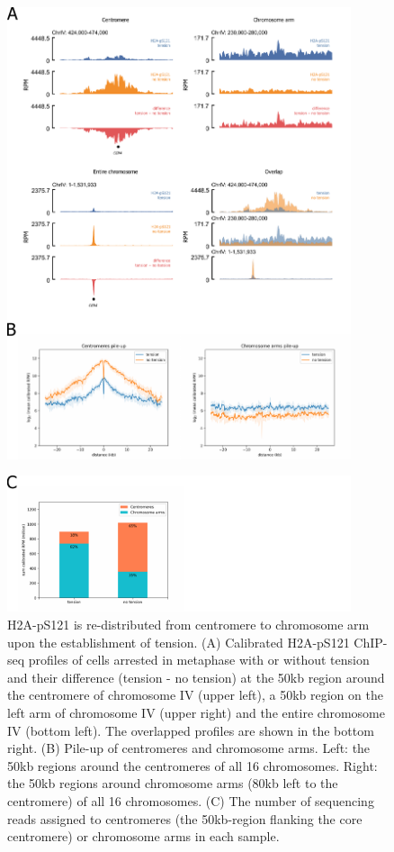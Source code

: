 \begin{figure}[htbp]
  \centering
  \includegraphics[width=0.9\textwidth]{chapter3/figures/pH2A ChIP-seq_1st.pdf}
\end{figure}

\begin{figure}[t]
  \centering
  \includegraphics[width=0.9\textwidth]{chapter3/figures/pH2A ChIP-seq_2nd.pdf}
  \caption[H2A-pS121 is re-distributed from centromere to chromosome arm upon the establishment of tension]{H2A-pS121 is re-distributed from centromere to chromosome arm upon the establishment of tension. (A) Calibrated H2A-pS121 ChIP-seq profiles of cells arrested in metaphase with or without tension and their difference (tension - no tension) at the 50kb region around the centromere of chromosome IV (upper left), a 50kb region on the left arm of chromosome IV (upper right) and the entire chromosome IV (bottom left). The overlapped profiles are shown in the bottom right. (B) Pile-up of centromeres and chromosome arms. Left: the 50kb regions around the centromeres of all 16 chromosomes. Right: the 50kb regions around chromosome arms (80kb left to the centromere) of all 16 chromosomes. (C) The number of sequencing reads assigned to centromeres (the 50kb-region flanking the core centromere) or chromosome arms in each sample. }
  \label{fig:ph2achipseq2nd}
\end{figure}

